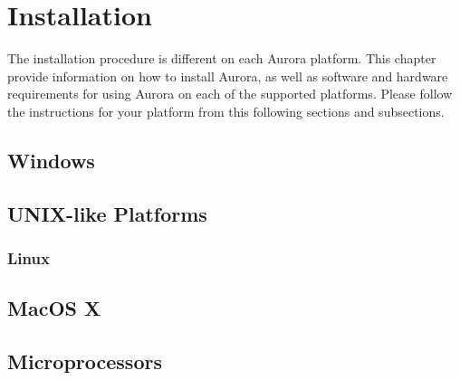 \chapter{Installation}
The installation procedure is different on each Aurora platform. This chapter provide information on how to install Aurora, as well as software and hardware requirements for using Aurora on each of the supported platforms. Please follow the instructions for your platform from this following sections and subsections.
\section{Windows}
\section{UNIX-like Platforms}
\subsection{Linux}

\section{MacOS X}
\section{Microprocessors}